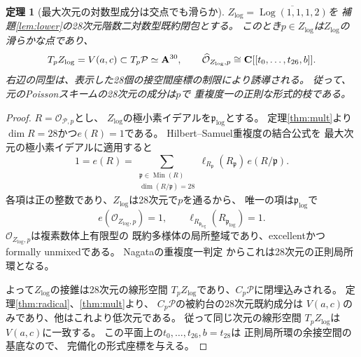 \documentclass[a4paper,11pt]{ltjsarticle}
\newtheorem{theorem}{定理}[section]
\theoremstyle{remark}\newtheorem{remark}[theorem]{注意}
\begin{document}
\begin{theorem}[最大次元の対数型成分は交点でも滑らか]
\label{thm:log-smooth-at-intersection}
$Z_{\mathrm{log}}=\overline{\operatorname{Log}(1,1,1,2)}$を
補題\ref{lem:lower}の28次元階数二対数型既約閉包とする。
このとき$p\in Z_{\mathrm{log}}$は$Z_{\mathrm{log}}$の滑らかな点であり、
\begin{equation}\label{eq:smooth-log-branch}
 T_pZ_{\mathrm{log}}=V(a,c)\subset T_p\mathcal P\simeq\mathbf A^{30},
 \qquad
 \widehat{\mathcal O}_{Z_{\mathrm{log}},p}
 \cong \mathbf C[[t_0,\ldots,t_{26},b]].
\end{equation}
右辺の同型は、表示した28個の接空間座標の制限により誘導される。
従って、元のPoissonスキームの28次元の成分は$p$で
重複度一の正則な形式的枝である。
\end{theorem}
\begin{proof}
$R=\mathcal O_{\mathcal P,p}$とし、
$Z_{\mathrm{log}}$の極小素イデアルを$\mathfrak p_{\mathrm{log}}$とする。
定理\ref{thm:mult}より$\dim R=28$かつ$e(R)=1$である。
Hilbert--Samuel重複度の結合公式\cite{StacksMult}を
最大次元の極小素イデアルに適用すると
\[
 1=e(R)=\sum_{\substack{\mathfrak p\in\operatorname{Min}(R)\\
                  \dim(R/\mathfrak p)=28}}
 \ell_{R_{\mathfrak p}}(R_{\mathfrak p})\,e(R/\mathfrak p).
\]
各項は正の整数であり、$Z_{\mathrm{log}}$は28次元で$p$を通るから、
唯一の項は$\mathfrak p_{\mathrm{log}}$で
\[
 e(\mathcal O_{Z_{\mathrm{log}},p})=1,\qquad
 \ell_{R_{\mathfrak p_{\mathrm{log}}}}(R_{\mathfrak p_{\mathrm{log}}})=1.
\]
$\mathcal O_{Z_{\mathrm{log}},p}$は複素数体上有限型の
既約多様体の局所整域であり、excellentかつformally unmixedである。
Nagataの重複度一判定\cite[Theorem 40.6]{NagataLocal}
からこれは28次元の正則局所環となる。

よって$Z_{\mathrm{log}}$の接錐は28次元の線形空間
$T_pZ_{\mathrm{log}}$であり、$C_p\mathcal P$に閉埋込みされる。
定理\ref{thm:radical}、\ref{thm:mult}より、
$C_p\mathcal P$の被約台の28次元既約成分は
$V(a,c)$のみであり、他はこれより低次元である。
従って同じ次元の線形空間
$T_pZ_{\mathrm{log}}$は$V(a,c)$に一致する。
この平面上の$t_0,\ldots,t_{26},b=t_{28}$は
正則局所環の余接空間の基底なので、
完備化の形式座標を与える。
\end{proof}
\end{document}
